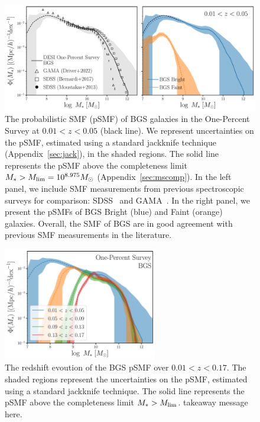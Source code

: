 \begin{figure}
\begin{center}
    \includegraphics[width=\textwidth]{figs/psmf_bgs_any_comp.pdf} 
    \caption{
        The probabilistic SMF (pSMF) of BGS galaxies in the One-Percent Survey
        at $0.01 < z < 0.05$ (black line). 
        We represent uncertainties on the pSMF, estimated using a standard
        jackknife technique (Appendix~\ref{sec:jack}), in the shaded regions.
        The solid line represents the pSMF above the completeness limit 
        $M_* > M_{\rm lim} = 10^{8.975}M_\odot$ (Appendix~\ref{sec:mscomp}).
        In the left panel, we include SMF measurements from previous
        spectroscopic surveys for comparison: SDSS~\citep{moustakas2013,
        bernardi2017} and GAMA~\citep{driver2022}. 
        In the right panel, we present the pSMFs of BGS Bright (blue) and
        Faint (orange) galaxies. 
        Overall, the SMF of BGS are in good agreement with previous SMF
        measurements in the literature.  
    }\label{fig:psmf}
\end{center}
\end{figure}

\begin{figure}
\begin{center}
    \includegraphics[width=0.6\textwidth]{figs/psmf_bgs_any_zevo.pdf} 
    \caption{
        The redshift evoution of the BGS pSMF over $0.01 < z < 0.17$. 
        The shaded regions represent the uncertainties on the pSMF, estimated
        using a standard jackknife technique.
        The solid line represents the pSMF above the completeness limit 
        $M_* > M_{\rm lim}$.
        {\color{red} takeaway message here}.
    }\label{fig:psmfz}
\end{center}
\end{figure}

